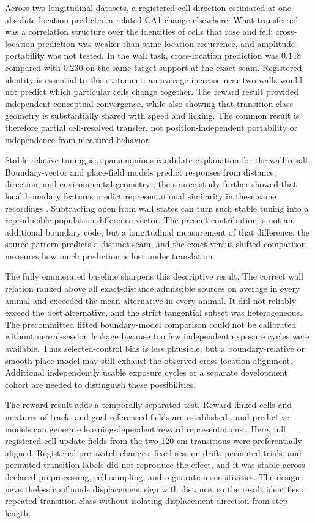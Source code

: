 \documentclass[10pt,twocolumn]{article}
\begin{document}
Across two longitudinal datasets, a registered-cell direction estimated at one
absolute location predicted a related CA1 change elsewhere. What transferred
was a correlation structure over the identities of cells that rose and fell;
cross-location prediction was weaker than same-location recurrence, and
amplitude portability was not tested. In the wall task, cross-location
prediction was $0.148$ compared with $0.230$ on the same target support at the
exact seam. Registered identity is essential to this statement:
an average increase near two walls would not predict which particular cells
change together. The reward result provided independent conceptual convergence,
while also showing that transition-class geometry is substantially shared with
speed and licking. The common result is therefore partial cell-resolved
transfer, not position-independent portability or independence from measured
behavior.

Stable relative tuning is a parsimonious candidate explanation for the wall
result. Boundary-vector and place-field models predict responses from distance,
direction, and environmental geometry
\citep{HartleyEtAl2000,BarryEtAl2006,MuessigEtAl2024}; the source study further
showed that local boundary features predict representational similarity in
these same recordings \citep{LeeEtAl2025}. Subtracting open from wall states can
turn such stable tuning into a reproducible population difference vector. The
present contribution is not an additional boundary code, but a longitudinal
measurement of that difference: the source pattern predicts a distinct seam,
and the exact-versus-shifted comparison measures how much prediction is lost
under translation.

The fully enumerated baseline sharpens this descriptive result. The correct
wall relation ranked above all exact-distance admissible sources on average in
every animal and exceeded the mean alternative in every animal. It did not
reliably exceed the best alternative, and the strict tangential subset was
heterogeneous. The precommitted fitted boundary-model comparison could not be
calibrated without neural-session leakage because too few independent exposure
cycles were available. Thus selected-control bias is less plausible, but a
boundary-relative or smooth-place model may still exhaust the observed
cross-location alignment. Additional independently usable exposure cycles or a
separate development cohort are needed to distinguish these possibilities.

The reward result adds a temporally separated test. Reward-linked cells and
mixtures of track- and goal-referenced fields are established
\citep{GauthierTank2018,QianEtAl2025,SosaEtAl2025}, and predictive models can
generate learning-dependent reward representations \citep{YaghoubiEtAl2026}.
Here, full registered-cell update fields from the two 120 cm transitions were
preferentially aligned. Registered pre-switch changes, fixed-session drift,
permuted trials, and permuted transition labels did not reproduce the effect,
and it was stable across declared preprocessing, cell-sampling, and registration
sensitivities. The design nevertheless confounds displacement sign with
distance, so the result identifies a repeated transition class without
isolating displacement direction from step length.
\end{document}
